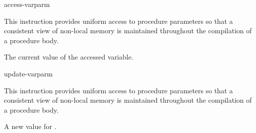 \begin{instruction}{access-varparm}

  \begin{notes}
    This instruction provides uniform access to \byref procedure
    parameters so that a consistent view of non-local memory is
    maintained throughout the compilation of a procedure body.
  \end{notes}

  \begin{results}
  \item The current value of the accessed \byref variable.
  \end{results}

  \begin{operands}
  \item {}
  \item {}
  \item {}
  \end{operands}

  \begin{seealso}
  \end{seealso}
\end{instruction}

\begin{instruction}{update-varparm}

  \begin{notes}
    This instruction provides uniform access to \byref procedure
    parameters so that a consistent view of non-local memory is
    maintained throughout the compilation of a procedure body.
  \end{notes}

  \begin{results}
  \item A new value for .
  \end{results}

  \begin{operands}
  \item {}
  \item {}
  \item {}
  \item {}
  \end{operands}

  \begin{seealso}
  \end{seealso}
\end{instruction}

